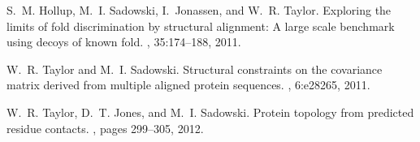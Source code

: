 \begin{thebibliography}{100}
S.~M. Hollup, M.~I. Sadowski, I.~Jonassen, and W.~R. Taylor.
\newblock Exploring the limits of fold discrimination by structural alignment:
  A large scale benchmark using decoys of known fold.
, 35:174--188, 2011.

W.~R. Taylor and M.~I. Sadowski.
\newblock Structural constraints on the covariance matrix derived from multiple
  aligned protein sequences.
, 6:e28265, 2011.

W.~R. Taylor, D.~T. Jones, and M.~I. Sadowski.
\newblock Protein topology from predicted residue contacts.
, pages 299--305, 2012.

\end{thebibliography}
